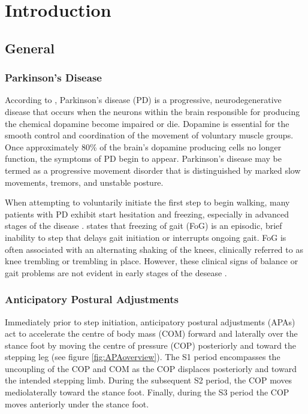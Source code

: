 \chapter{Introduction}
\label{ch:Introduction}

\section{General}

\subsection{Parkinson's Disease}

According to \cite{patients_medical_definition_2014}, Parkinson's disease (PD) is a progressive, neurodegenerative disease that occurs when the neurons within the brain responsible for producing the chemical dopamine become impaired or die. Dopamine is essential for the smooth control and coordination of the movement of voluntary muscle groups. Once approximately 80\% of the brain's dopamine producing cells no longer function, the symptoms of PD begin to appear. Parkinson's disease may be termed as a progressive movement disorder that is distinguished by marked slow movements, tremors, and unstable posture.

When attempting to voluntarily initiate the first step to begin walking, many patients with PD exhibit start hesitation and freezing, especially in advanced stages of the disease \cite{mancini_anticipatory_2009}. \cite{jacobs_knee_2009} states that freezing of gait (FoG) is an episodic, brief inability to step that delays gait initiation or interrupts ongoing gait. FoG is often associated with an alternating shaking of the knees, clinically referred to as knee trembling or trembling in place. However, these clinical signs of balance or gait problems are not evident in early stages of the desease \cite{mancini_anticipatory_2009}.

\subsection{Anticipatory Postural Adjustments}

Immediately prior to step initiation, anticipatory postural adjustments (APAs) act to accelerate the centre of body mass (COM) forward and laterally over the stance foot by moving the centre of pressure (COP) posteriorly and toward the stepping leg \cite{mancini_anticipatory_2009} (see figure \ref{fig:APAoverview}). The S1 period encompasses the uncoupling of the COP and COM as the COP displaces posteriorly and toward the intended stepping limb. During the subsequent S2 period, the COP moves mediolaterally toward the stance foot. Finally, during the S3 period the COP moves anteriorly under the stance foot.

